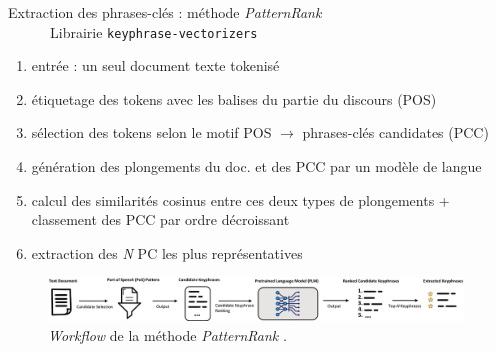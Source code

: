 \begin{frame}{Extraction des phrases-clés : méthode \textit{PatternRank}\\
\quad \quad \quad\ \quad \quad \quad \quad \quad \quad \quad \ \ \ \ \ \small{Librairie \texttt{keyphrase-vectorizers}}}
\begin{enumerate}
\small
\item entrée : un seul document texte tokenisé
\item étiquetage des tokens avec les balises du partie du discours (POS)
\item sélection des tokens selon le motif POS $\rightarrow$ phrases-clés candidates (PCC)
\item génération des plongements du doc. et des PCC par un modèle de langue
\item calcul des similarités cosinus entre ces deux types de plongements +  \\classement des PCC par ordre décroissant
\item extraction des \textit{N} PC les plus représentatives
\end{enumerate}
\begin{figure}
    \centering
    \includegraphics[width=110mm,scale=0.5]{pic/patternrank_workflow.png}
    \caption{\textit{Workflow} de la méthode \textit{PatternRank} \citep{schopf2022}.}
    \label{fig:enter-label}
\end{figure}
\end{frame}

